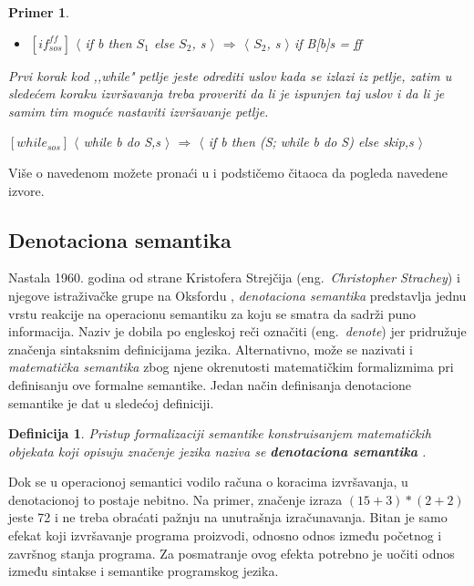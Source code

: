 \documentclass[a4paper]{article}
\newtheorem{primer}{Primer}[section]
\newtheorem{definicija}{Definicija}[section]
\begin{document}
{\begin{primer}
\begin{itemize}
	\item $[if^{ff}_{sos}]$ $\langle$ if b then $S_1$ else $S_2$, s $\rangle$ $\Longrightarrow$ $\langle$ $S_2$, s $\rangle$ \hspace{1cm} if B[b]s = ff
\end{itemize}
Prvi korak kod ,,while" petlje jeste odrediti uslov kada se izlazi iz petlje, zatim u sledećem koraku izvršavanja treba proveriti da li je ispunjen taj uslov i da li je samim tim moguće nastaviti izvršavanje petlje.
\begin{center} $[while_{sos}]$ $\langle$ while b do S,s $\rangle$ $\Longrightarrow$ $\langle$ if b then (S; while b do S) else skip,s $\rangle$ \end{center}
\end{primer}
Više o navedenom možete pronaći u \cite{wiley} i podstičemo čitaoca da pogleda navedene izvore.

\subsection{Denotaciona semantika}
\label{sec:densem}

\qquad Nastala 1960. godina od strane Kristofera Strejčija (eng.~{\em Christopher Strachey}) i njegove istraživačke grupe na Oksfordu \cite{slonneger1995book}, \textit{denotaciona semantika} predstavlja jednu vrstu reakcije na operacionu semantiku za koju se smatra da sadrži puno informacija. Naziv je dobila po engleskoj reči označiti (eng.~{\em denote}) jer pridružuje značenja sintaksnim definicijama jezika. Alternativno, može se nazivati i \textit{matematička semantika} zbog njene okrenutosti matematičkim formalizmima pri definisanju ove formalne semantike. Jedan način definisanja denotacione semantike je dat u sledećoj definiciji.
\begin{definicija}
Pristup formalizaciji semantike konstruisanjem matematičkih objekata koji
opisuju značenje jezika naziva se \textbf{denotaciona semantika} \cite{milena}.
\end{definicija}

Dok se u operacionoj semantici vodilo računa o koracima izvršavanja, u denotacionoj to postaje nebitno. Na primer, značenje izraza $ (15+3)*(2+2) $ jeste 72 i ne treba obraćati pažnju na unutrašnja izračunavanja. Bitan je samo efekat koji izvršavanje programa proizvodi, odnosno odnos između početnog i završnog stanja programa. Za posmatranje ovog efekta potrebno je uočiti odnos između sintakse i semantike programskog jezika.

}
\end{document}
